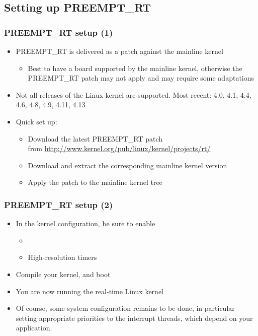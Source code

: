 \subsection{Setting up PREEMPT\_RT}

\begin{frame}
  \frametitle{PREEMPT\_RT setup (1)}
  \begin{itemize}
  \item PREEMPT\_RT is delivered as a patch against the mainline
    kernel
    \begin{itemize}
    \item Best to have a board supported by the mainline kernel,
      otherwise the PREEMPT\_RT patch may not apply and may require
      some adaptations
    \end{itemize}
  \item Not all releases of the Linux kernel are supported.
      Most recent: 4.0, 4.1, 4.4, 4.6, 4.8, 4.9, 4.11, 4.13
  \item Quick set up:
    \begin{itemize}
    \item Download the latest PREEMPT\_RT patch\\
      from \footnotesize \url{http://www.kernel.org/pub/linux/kernel/projects/rt/} \normalsize
    \item Download and extract the corresponding mainline kernel
      version
    \item Apply the patch to the mainline kernel tree
    \end{itemize}
  \end{itemize}
\end{frame}

\begin{frame}
  \frametitle{PREEMPT\_RT setup (2)}
  \begin{itemize}
  \item In the kernel configuration, be sure to enable
    \begin{itemize}
    \item {}
    \item High-resolution timers
    \end{itemize}
  \item Compile your kernel, and boot
  \item You are now running the real-time Linux kernel
  \item Of course, some system configuration remains to be done, in
    particular setting appropriate priorities to the interrupt
    threads, which depend on your application.
  \end{itemize}
\end{frame}

